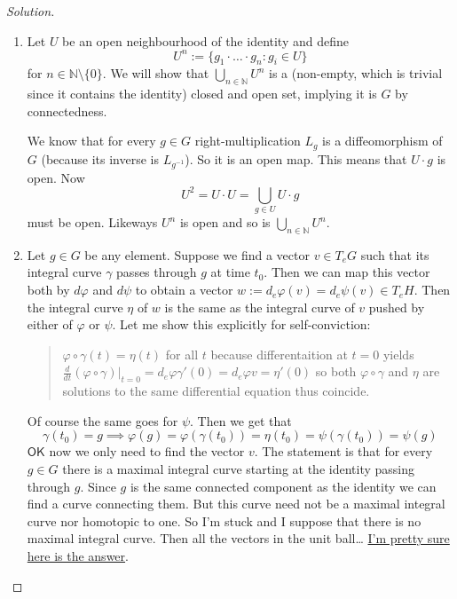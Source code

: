 \begin{proof}[Solution]\leavevmode
	\begin{enumerate}[label=\alph*.]
		\item Let $U$ be an open  neighbourhood of the identity and define
			\[U^n:=\{g_1\cdot\ldots \cdot g_n:g_{i}\in U\}\]
		for $n \in\mathbb{N}\setminus\{0\}$. We will show that $\bigcup_{n \in\mathbb{N}} U^n$ is a (non-empty, which is trivial since it contains the identity) closed and open set, implying it is $G$ by connectedness.

		We know that for every $g\in G$ right-multiplication $L_g$  is a diffeomorphism of $G$ (because its inverse is $L_{g^{-1}}$). So it is an open map. This means that $U\cdot g$ is open. Now
		\[U^2=U\cdot U=\bigcup_{g\in U}U\cdot g \]
		must be open. Likeways $U^n$ is open and so is $\bigcup_{n \in\mathbb{N}} U^n$.



		\item Let $g\in G$ be any element. Suppose we find a vector $v\in T_eG$ such that its integral curve $\gamma$ passes through $g$ at time $t_0$. Then we can map this vector both by $d\varphi$ and $d\psi$ to obtain a vector $w:=d_e\varphi(v)=d_e\psi(v)\in T_eH$. Then the integral curve $\eta$ of  $w$ is the same as the integral curve of $v$ pushed by either of  $\varphi$ or $\psi$. Let me show this explicitly for self-conviction:
			\begin{quotation}
				$\varphi\circ \gamma(t)=\eta(t)$ for all $t$ because differentaition at $t=0$ yields  $\frac{d}{dt}(\varphi\circ \gamma)\Big|_{t=0}=d_e\varphi\gamma'(0)=d_e\varphi v=\eta'(0)$ so both $\varphi\circ \gamma$ and $\eta$ are solutions to the same differential equation thus coincide.
			\end{quotation}
			Of course the same goes for $\psi$. Then we get that
			\[\gamma(t_0)=g\implies \varphi(g)=\varphi(\gamma(t_0))=\eta(t_0)=\psi(\gamma(t_0))=\psi(g)\]
$\mathsf{OK}$ now we only need to find the vector $v$. The statement is that for every $g\in G$ there is a maximal integral curve starting at the identity passing through $g$. Since $g$ is the same connected component as the identity we can find a curve connecting them. But this curve need not be a maximal integral curve nor homotopic to one. So I'm stuck and I suppose that there is no maximal integral curve. Then all the vectors in the unit ball… \href{https://math.stackexchange.com/questions/1258904/how-to-show-that-for-every-element-g-in-a-lie-group-the-curve-gammat-g}{I'm pretty sure here is the answer}.

	\end{enumerate}
\end{proof}

